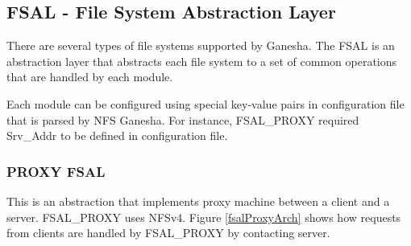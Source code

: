 \documentclass[11pt, journal, twocolumn, twoside]{IEEEtran}
\begin{document}
\subsection{FSAL - File System Abstraction Layer}
There are several types of file systems supported by Ganesha. The FSAL is an
abstraction layer that abstracts each file system to a set of common operations
that are handled by each module.

Each module can be configured using special key-value pairs in
configuration file that is parsed by NFS Ganesha. For instance, FSAL\_PROXY
required Srv\_Addr to be defined in configuration file.

\subsubsection{PROXY FSAL}
This is an abstraction that implements proxy machine between a client and a
server. FSAL\_PROXY uses NFSv4. Figure \ref{fsalProxyArch} shows how requests
from clients are handled by FSAL\_PROXY by contacting server.

\begin{figure*}[!btp]
  \centering
  \caption{Architecture of FSAL\_PROXY}
  \label{fsalProxyArch}
\end{figure*}
\end{document}
